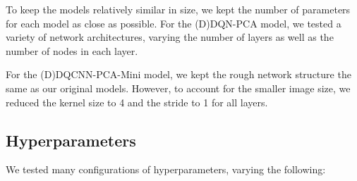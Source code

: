 \documentclass[11pt]{article}
\begin{document}
To keep the models relatively similar in size, we kept the number of parameters for each model as close as possible. For the (D)DQN-PCA model, we tested a variety of network architectures, varying the number of layers as well as the number of nodes in each layer. 

For the (D)DQCNN-PCA-Mini model, we kept the rough network structure the same as our original models. However, to account for the smaller image size, we reduced the kernel size to 4 and the stride to 1 for all layers.

\subsection{Hyperparameters}

We tested many configurations of hyperparameters, varying the following: 
\end{document}
